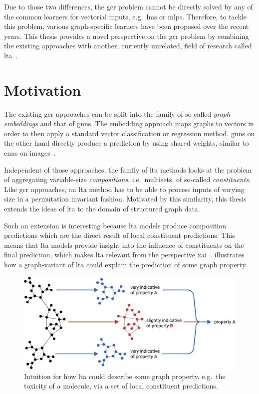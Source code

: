 Due to those two differences, the \ac{gcr} problem cannot be directly solved by any of the common learners for vectorial inputs, e.g.\ \acp{lm} or \acp{mlp}.
Therefore, to tackle this problem, various graph-specific learners have been proposed over the recent years.
This thesis provides a novel perspective on the \ac{gcr} problem by combining the existing approaches with another, currently unrelated, field of research called \ac{lta}~\cite{Melnikov2016}\cite{Melnikov2019}.

\section{Motivation}%
\label{sec:intro:motivation}

The existing \ac{gcr} approaches can be split into the family of so-called \textit{graph embeddings} and that of \acp{gnn}.
The embedding approach maps graphs to vectors in order to then apply a standard vector classification or regression method.
\Acp{gnn} on the other hand directly produce a prediction by using shared weights, similar to \acp*{cnn} on images~\cite{LeCun1998}.

Independent of those approaches, the family of \ac{lta} methods looks at the problem of aggregating variable-size \textit{compositions}, i.e.\ multisets, of so-called \textit{constituents}.
Like \ac{gcr} approaches, an \ac{lta} method has to be able to process inputs of varying size in a permutation invariant fashion.
Motivated by this similarity, this thesis extends the ideas of \ac{lta} to the domain of structured graph data.

Such an extension is interesting because \ac{lta} models produce composition predictions which are the direct result of local constituent predictions.
This means that \ac{lta} models provide insight into the influence of constituents on the final prediction, which makes \ac{lta} relevant from the perspective \acl{xai}~\cite{Gilpin2018}.
 illustrates how a graph-variant of \ac{lta} could explain the prediction of some graph property.
\begin{figure}[ht]
	\centering
	\includegraphics[width=0.8\linewidth]{gfx/introduction/intuition.pdf}
	\caption{Intuition for how \ac{lta} could describe some graph property, e.g.\ the toxicity of a molecule, via a set of local constituent predictions.}\label{fig:intro:intuition}
\end{figure}

